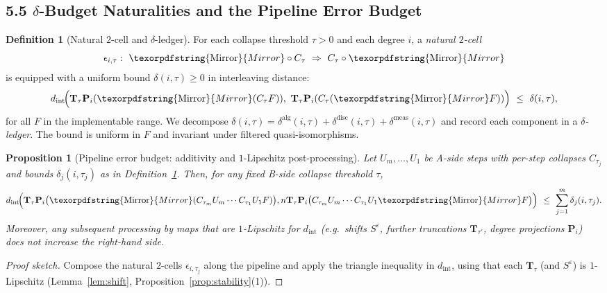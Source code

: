 \documentclass[11pt]{article}
\DeclareRobustCommand{\hyp}{\nobreakdash-}
\numberwithin{equation}{section}
\newtheorem{proposition}[theorem]{Proposition}
\theoremstyle{definition}
\newtheorem{definition}[theorem]{Definition}
\DeclareRobustCommand{\Mirror}{\texorpdfstring{\ensuremath{\operatorname{Mirror}}}{Mirror}}
\providecommand{\n}{\unskip\space}
\begin{document}
\subsection*{5.5 $\delta$-Budget Naturalities and the Pipeline Error Budget}

\begin{definition}[Natural $2$-cell and $\delta$-ledger]\label{def:delta-2cell}
For each collapse threshold $\tau>0$ and each degree $i$, a \emph{natural $2$-cell}
\[
\epsilon_{i,\tau}:\ \Mirror\circ C_\tau\ \Rightarrow\ C_\tau\circ \Mirror
\]
is equipped with a uniform bound $\delta(i,\tau)\ge 0$ in interleaving distance:
\[
d_{\mathrm{int}}\!\Big(\mathbf{T}_\tau \mathbf{P}_i(\Mirror(C_\tau F)),\ \mathbf{T}_\tau \mathbf{P}_i(C_\tau(\Mirror F))\Big)\ \le\ \delta(i,\tau),
\]
for all $F$ in the implementable range. We decompose $\delta(i,\tau)=\delta^{\mathrm{alg}}(i,\tau)+\delta^{\mathrm{disc}}(i,\tau)+\delta^{\mathrm{meas}}(i,\tau)$ and record each component in a \emph{$\delta$-ledger}. The bound is uniform in $F$ and invariant under filtered quasi\hyp isomorphisms.
\end{definition}

\begin{proposition}[Pipeline error budget: additivity and $1$-Lipschitz post\hyp processing]\label{prop:pipeline-budget}
Let $U_m,\dots,U_1$ be A\hyp side steps with per\hyp step collapses $C_{\tau_j}$ and bounds $\delta_j(i,\tau_j)$ as in Definition~\ref{def:delta-2cell}. Then, for any fixed B\hyp side collapse threshold $\tau$,
\[
d_{\mathrm{int}}\!\Big(\n\mathbf{T}_\tau \mathbf{P}_i\big(\Mirror(C_{\tau_m}U_m\cdots C_{\tau_1}U_1F)\big),\\n\mathbf{T}_\tau \mathbf{P}_i\big(C_{\tau_m}U_m\cdots C_{\tau_1}U_1\Mirror F\big)\n\Big)\ \le\ \sum_{j=1}^m \delta_j(i,\tau_j).
\]
Moreover, any subsequent processing by maps that are $1$-Lipschitz for $d_{\mathrm{int}}$ (e.g.\ shifts $S^\varepsilon$, further truncations $\mathbf{T}_{\tau'}$, degree projections $\mathbf{P}_i$) does not increase the right\hyp hand side.
\end{proposition}

\begin{proof}[Proof sketch]
Compose the natural $2$-cells $\epsilon_{i,\tau_j}$ along the pipeline and apply the triangle inequality in $d_{\mathrm{int}}$, using that each $\mathbf{T}_\tau$ (and $S^\varepsilon$) is $1$-Lipschitz (Lemma~\ref{lem:shift}, Proposition~\ref{prop:stability}(1)).
\end{proof}
\end{document}

